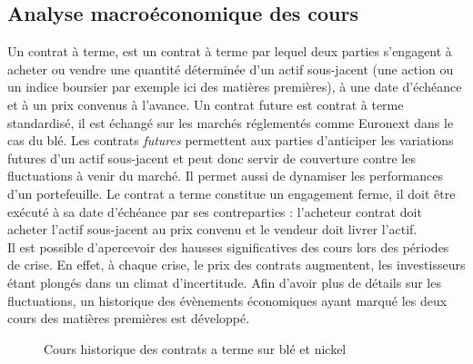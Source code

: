 \subsection{Analyse macroéconomique des cours}
Un contrat à terme, est un contrat à terme par lequel deux parties s'engagent à acheter ou vendre une quantité déterminée d'un actif sous-jacent (une 
action ou un indice boursier par exemple ici des matières premières), à une date d'échéance et à un prix convenus à l'avance. Un contrat future est contrat à terme 
standardisé, il est échangé sur les marchés réglementés comme Euronext dans le cas du blé. Les contrats \textit{futures} permettent aux parties d'anticiper les variations 
futures d'un actif sous-jacent et peut donc servir de couverture contre les fluctuations à venir du marché. Il permet aussi de dynamiser les performances d'un 
portefeuille. Le contrat a terme constitue un engagement ferme, il doit être exécuté à sa date d'échéance par ses contreparties : l'acheteur contrat doit acheter l'actif 
sous-jacent au prix convenu et le vendeur doit livrer l'actif.\\[11pt]
Il est possible d'apercevoir des hausses significatives des cours lors des périodes de crise. En effet, à chaque crise, le prix des contrats augmentent, les investisseurs 
étant plongés dans un climat d'incertitude. Afin d'avoir plus de détails sur les fluctuations, un historique des évènements économiques ayant marqué les deux cours des 
matières premières est développé.
\begin{figure}[H]
    \centering
    \resizebox{\textwidth}{!}{}
    \caption{Cours historique des contrats a terme sur blé et nickel}
\end{figure}
